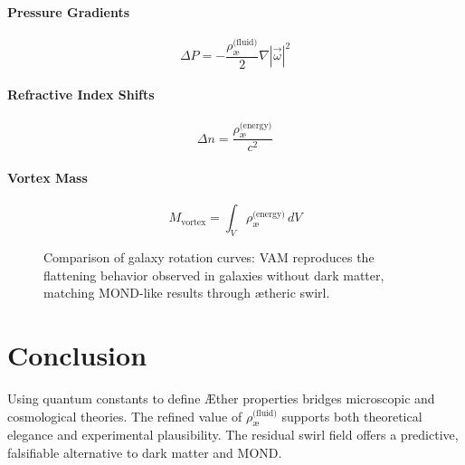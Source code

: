 \documentclass[12pt]{article}
\begin{document}
    \paragraph{Pressure Gradients}
    \[
        \Delta P = -\frac{\rho_{\text{\ae}}^{\text{(fluid)}}}{2} \nabla |\vec{\omega}|^2
    \]

    \paragraph{Refractive Index Shifts}
    \[
        \Delta n = \frac{\rho_{\text{\ae}}^{\text{(energy)}}}{c^2}
    \]

    \paragraph{Vortex Mass}
    \[
        M_{\text{vortex}} = \int_V \rho_{\text{\ae}}^{\text{(energy)}} \, dV
    \]


    \begin{figure}[h]
        \centering
        \caption{Comparison of galaxy rotation curves: VAM reproduces the flattening behavior observed in galaxies without dark matter, matching MOND-like results through ætheric swirl.}
    \end{figure}


    \section{Conclusion}

    Using quantum constants to define \AE{}ther properties bridges microscopic and cosmological theories. The refined value of $\rho_{\text{\ae}}^{\text{(fluid)}}$ supports both theoretical elegance and experimental plausibility. The residual swirl field offers a predictive, falsifiable alternative to dark matter and MOND.
\end{document}

